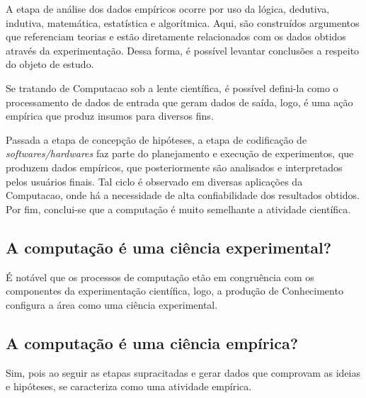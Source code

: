 A etapa de análise dos dados empíricos ocorre por uso da lógica, dedutiva, indutiva, matemática, estatística e algorítmica. Aqui, são construídos argumentos que referenciam teorias e estão diretamente relacionados com os dados obtidos através da experimentação. Dessa forma, é possível levantar conclusões a respeito do objeto de estudo.

Se tratando de \gls{Computacao} sob a lente científica, é possível defini-la como o processamento de dados de entrada que geram dados de saída, logo, é uma ação empírica que produz insumos para diversos fins.

Passada a etapa de concepção de hipóteses, a etapa de codificação de \textit{softwares/hardwares} faz parte do planejamento e execução de experimentos, que produzem dados empíricos, que posteriormente são analisados e interpretados pelos usuários finais. Tal ciclo é observado em diversas aplicações da \gls{Computacao}, onde há a necessidade de alta confiabilidade dos resultados obtidos. Por fim, conclui-se que a computação é muito semelhante a atividade científica. 

\subsection{A computação é uma ciência experimental?}

É notável que os processos de computação etão em congruência com os componentes da experimentação científica, logo, a produção de \gls{Conhecimento} configura a área como uma ciência experimental.

\subsection{A computação é uma ciência empírica?}

Sim, pois ao seguir as etapas supracitadas e gerar dados que comprovam as ideias e hipóteses, se caracteriza como uma atividade empírica.